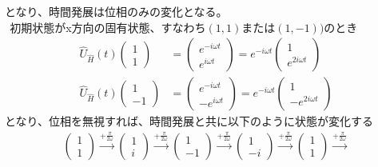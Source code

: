 \documentclass{jsarticle}  %
\numberwithin{equation}{section} %
\numberwithin{figure}{section}
\begin{document}
    となり、時間発展は位相のみの変化となる。\\
    $\ \ $初期状態がx方向の固有状態、すなわち$(1,1)$または$(1,-1))$のとき
    \begin{align}
        \hat{U}_{\hat{H}}(t) 
        \left(
        \begin{matrix}
            1\\
            1
        \end{matrix}
        \right) &= 
        \left(
        \begin{matrix}
            e^{-i\omega t}\\
            e^{i\omega t}
        \end{matrix}
        \right) = e^{-i\omega t}
        \left(
        \begin{matrix}
            1\\
            e^{2i\omega t}
        \end{matrix}
        \right)  \\
        \hat{U}_{\hat{H}}(t) 
        \left(
        \begin{matrix}
            1\\
            -1
        \end{matrix}
        \right) &= 
        \left(
        \begin{matrix}
            e^{-i\omega t}\\
            -e^{i\omega t}
        \end{matrix}
        \right) = e^{-i\omega t}
        \left(
        \begin{matrix}
            1\\
            -e^{2i\omega t}
        \end{matrix}
        \right) 
    \end{align}
    となり、位相を無視すれば、時間発展と共に以下のように状態が変化する
    \begin{align}
        \left(
        \begin{matrix}
            1\\
            1
        \end{matrix}
        \right) \xrightarrow{+\frac{\pi}{2\omega}}
        \left(
        \begin{matrix}
            1\\
            i
        \end{matrix}
        \right) \xrightarrow{+\frac{\pi}{2\omega}}
        \left(
        \begin{matrix}
            1\\
            -1
        \end{matrix}
        \right) \xrightarrow{+\frac{\pi}{2\omega}}
        \left(
        \begin{matrix}
            1\\
            -i
        \end{matrix}
        \right) \xrightarrow{+\frac{\pi}{2\omega}}
        \left(
        \begin{matrix}
            1\\
            1
        \end{matrix}
        \right) \xrightarrow{+\frac{\pi}{2\omega}}
    \end{align}
\end{document}

